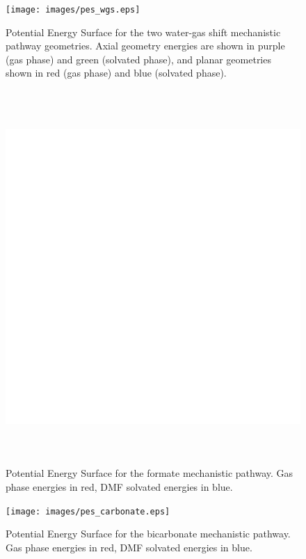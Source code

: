 \begin{landscape}
\begin{figure}[!htbp]
 \begin{center}
  \texttt{[image: images/pes\_wgs.eps]}
 \end{center}
\caption[Potential Energy Surface for the two water-gas shift mechanistic pathway geometries.]{Potential Energy Surface for the two water-gas shift mechanistic pathway geometries. Axial geometry energies are shown in purple (gas phase) and green (solvated phase), and planar geometries shown in red (gas phase) and blue (solvated phase).}
\label{fig.pes_wgs}
\end{figure} 

\begin{figure}[!htbp]
 \begin{center}
  \includegraphics[clip=true, height=142mm, keepaspectratio]{images/pes_formate.eps}
 \end{center}
\caption[Potential Energy Surface for the formate mechanistic pathway.]{Potential Energy Surface for the formate mechanistic pathway. Gas phase energies in red, DMF solvated energies in blue.}
\label{fig.pes_formate}
\end{figure} 

\begin{figure}[!htbp]
 \begin{center}
  \texttt{[image: images/pes\_carbonate.eps]}
 \end{center}
\caption[Potential Energy Surface for the bicarbonate mechanistic pathway.]{Potential Energy Surface for the bicarbonate mechanistic pathway. Gas phase energies in red, DMF solvated energies in blue.}
\label{fig.pes_carbonate}


\end{figure}
\end{landscape}
